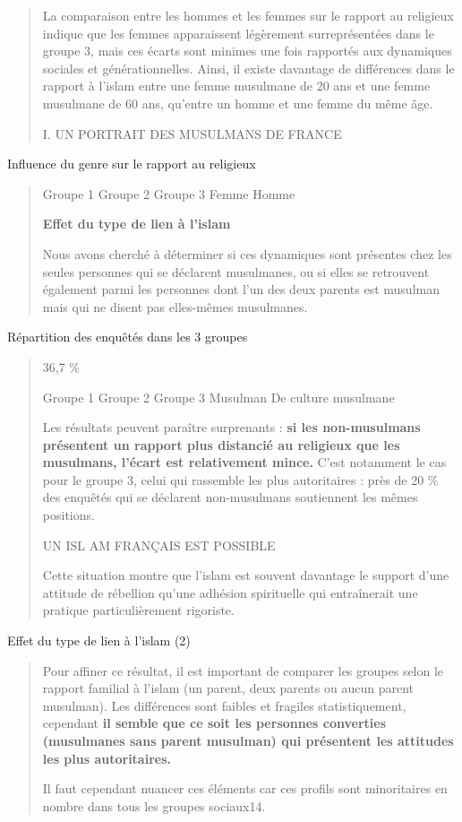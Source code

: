 \begin{quote}
La comparaison entre les hommes et les femmes sur le rapport au
religieux indique que les femmes apparaissent légèrement surreprésentées
dans le groupe 3, mais ces écarts sont minimes une fois rapportés aux
dynamiques sociales et générationnelles. Ainsi, il existe davantage de
différences dans le rapport à l'islam entre une femme musulmane de 20
ans et une femme musulmane de 60 ans, qu'entre un homme et une femme du
même âge.

I. UN PORTRAIT DES MUSULMANS DE FRANCE
\end{quote}

Influence du genre sur le rapport au religieux

\begin{quote}
Groupe 1 Groupe 2 Groupe 3 Femme Homme

\textbf{Effet du type de lien à l'islam}

Nous avons cherché à déterminer si ces dynamiques sont présentes chez
les seules personnes qui se déclarent musulmanes, ou si elles se
retrouvent également parmi les personnes dont l'un des deux parents est
musulman mais qui ne disent pas elles-mêmes musulmanes.
\end{quote}

Répartition des enquêtés dans les 3 groupes

\begin{quote}
36,7 \%

Groupe 1 Groupe 2 Groupe 3 Musulman De culture musulmane

Les résultats peuvent paraître surprenants : \textbf{si les
non-musulmans présentent un rapport plus distancié au religieux que les
musulmans, l'écart est relativement mince.} C'est notamment le cas pour
le groupe 3, celui qui rassemble les plus autoritaires : près de 20 \%
des enquêtés qui se déclarent non-musulmans soutiennent les mêmes
positions.

UN ISL AM FRANÇAIS EST POSSIBLE

Cette situation montre que l'islam est souvent davantage le support
d'une attitude de rébellion qu'une adhésion spirituelle qui entraînerait
une pratique particulièrement rigoriste.
\end{quote}

Effet du type de lien à l'islam (2)

\begin{quote}
Pour affiner ce résultat, il est important de comparer les groupes selon
le rapport familial à l'islam (un parent, deux parents ou aucun parent
musulman). Les différences sont faibles et fragiles statistiquement,
cependant \textbf{il semble que ce soit les personnes converties
(musulmanes sans parent musulman) qui présentent les attitudes les plus
autoritaires.}

Il faut cependant nuancer ces éléments car ces profils sont minoritaires
en nombre dans tous les groupes sociaux14.
\end{quote}

